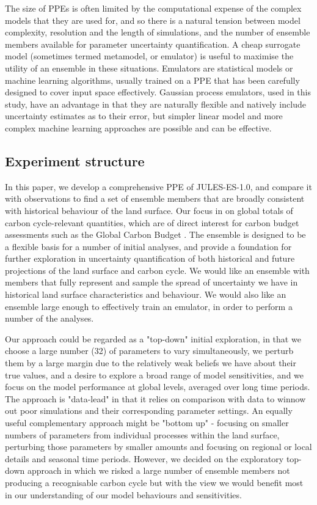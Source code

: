 \documentclass[gmd, manuscript]{copernicus}
\begin{document}
The size of PPEs is often limited by the computational expense of the complex models that they are used for, and so there is a natural tension between model complexity, resolution and the length of simulations, and the number of ensemble members available for parameter uncertainty quantification. A cheap surrogate model (sometimes termed metamodel, or emulator) is useful to maximise the utility of an ensemble in these situations. Emulators are statistical models or machine learning algorithms, usually trained on a PPE that has been carefully designed to cover input space effectively. Gaussian process emulators, used in this study, have an advantage in that they are naturally flexible and natively include uncertainty estimates as to their error, but simpler linear model and more complex machine learning approaches are possible and can be effective.

\subsection{Experiment structure}\label{ssec:experiment_structure}

In this paper, we develop a comprehensive PPE of JULES-ES-1.0, and compare it with observations to find a set of ensemble members that are broadly consistent with historical behaviour of the land surface. Our focus in on global totals of carbon cycle-relevant quantities, which are of direct interest for carbon budget assessments such as the Global Carbon Budget \citep{essd-14-1917-2022}. The ensemble is designed to be a flexible basis for a number of initial analyses, and provide a foundation for further exploration in uncertainty quantification of both historical and future projections of the land surface and carbon cycle.  We would like an ensemble with members that fully represent and sample the spread of uncertainty we have in historical land surface characteristics and behaviour. We would also like an ensemble large enough to effectively train an emulator, in order to perform a number of the analyses.

Our approach could be regarded as a "top-down" initial exploration, in that we choose a large number (32) of parameters to vary simultaneously, we perturb them by a large margin due to the relatively weak beliefs we have about their true values, and a desire to explore a broad range of model sensitivities, and we focus on the model performance at global levels, averaged over long time periods. The approach is "data-lead" in that it relies on comparison with data to winnow out poor simulations and their corresponding parameter settings. An equally useful complementary approach might be "bottom up" - focusing on smaller numbers of parameters from individual processes within the land surface, perturbing those parameters by smaller amounts and focusing on regional or local details and seasonal time periods. However, we decided on the exploratory top-down approach in which we risked a large number of ensemble members not producing a recognisable carbon cycle but with the view we would benefit most in our understanding of our model behaviours and sensitivities.
\end{document}
